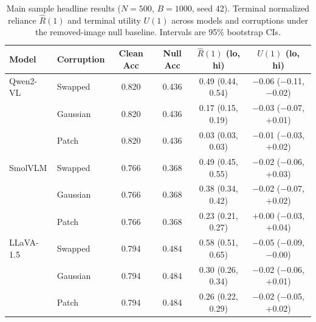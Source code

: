\begin{table}[t]
\centering
\caption{Main sample headline results ($N=500$, $B=1000$, seed 42).
  Terminal normalized reliance $\hat{R}(1)$ and terminal utility $U(1)$
  across models and corruptions under the removed-image null baseline.
  Intervals are 95\% bootstrap CIs.}
\label{tab:headline-main}
{\footnotesize\setlength{\tabcolsep}{3pt}%
\begin{tabular}{llcccc}
\toprule
\textbf{Model} & \textbf{Corruption} & Clean Acc & Null Acc & $\hat{R}(1)$ (lo, hi) & $U(1)$ (lo, hi) \\
\midrule
Qwen2-VL  & Swapped & 0.820 & 0.436 & 0.49 (0.44, 0.54) & $-$0.06 ($-$0.11, $-$0.02) \\
          & Gaussian & 0.820 & 0.436 & 0.17 (0.15, 0.19) & $-$0.03 ($-$0.07, $+$0.01) \\
          & Patch    & 0.820 & 0.436 & 0.03 (0.03, 0.03) & $-$0.01 ($-$0.03, $+$0.02) \\
SmolVLM   & Swapped & 0.766 & 0.368 & 0.49 (0.45, 0.55) & $-$0.02 ($-$0.06, $+$0.03) \\
          & Gaussian & 0.766 & 0.368 & 0.38 (0.34, 0.42) & $-$0.02 ($-$0.07, $+$0.02) \\
          & Patch    & 0.766 & 0.368 & 0.23 (0.21, 0.27) & $+$0.00 ($-$0.03, $+$0.04) \\
LLaVA-1.5 & Swapped & 0.794 & 0.484 & 0.58 (0.51, 0.65) & $-$0.05 ($-$0.09, $-$0.00) \\
           & Gaussian & 0.794 & 0.484 & 0.30 (0.26, 0.34) & $-$0.02 ($-$0.06, $+$0.01) \\
           & Patch    & 0.794 & 0.484 & 0.26 (0.22, 0.29) & $-$0.02 ($-$0.05, $+$0.02) \\
\bottomrule
\end{tabular}}
\end{table}
